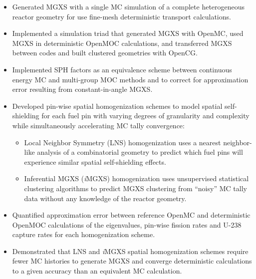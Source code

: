 \begin{emphbox}
\begin{itemize}
\item Generated \ac{MGXS} with a single \ac{MC} simulation of a complete heterogeneous reactor geometry for use fine-mesh deterministic transport calculations.
\item Implemented a simulation triad that generated \ac{MGXS} with OpenMC, used \ac{MGXS} in deterministic OpenMOC calculations, and transferred \ac{MGXS} between codes and built clustered geometries with OpenCG.
\item Implemented \ac{SPH} factors as an equivalence scheme between continuous energy \ac{MC} and multi-group \ac{MOC} methods and to correct for approximation error resulting from constant-in-angle \ac{MGXS}.
\item Developed pin-wise spatial homogenization schemes to model spatial self-shielding for each fuel pin with varying degrees of granularity and complexity while simultaneously accelerating \ac{MC} tally convergence:
\begin{itemize}
  \item Local Neighbor Symmetry (LNS) homogenization uses a nearest neighbor-like analysis of a combinatorial geometry to predict which fuel pins will experience similar spatial self-shielding effects.
  \item Inferential \ac{MGXS} (\textit{i}\ac{MGXS}) homogenization uses unsupervised statistical clustering algorithms to predict \ac{MGXS} clustering from ``noisy'' \ac{MC} tally data without any knowledge of the reactor geometry.
\end{itemize}
\item Quantified approximation error between reference OpenMC and deterministic OpenMOC calculations of the eigenvalues, pin-wise fission rates and U-238 capture rates for each homogenization scheme.
\item Demonstrated that \ac{LNS} and \textit{i}\ac{MGXS} spatial homogenization schemes require fewer \ac{MC} histories to generate \ac{MGXS} and converge deterministic calculations to a given accuracy than an equivalent \ac{MC} calculation.
\end{itemize}
\end{emphbox}

